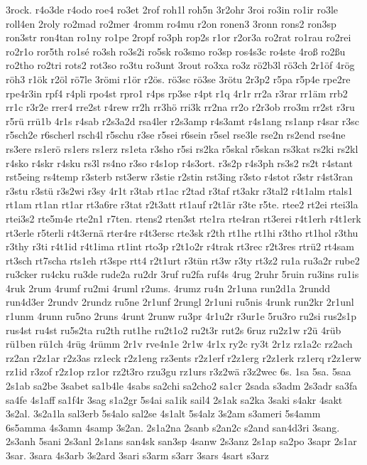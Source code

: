 {3rock.
r4o3de
r4odo
roe4
ro3et
2rof
roh1l
roh5n
3r2ohr
3roi
ro3in
ro1ir
ro3le
roll4en
2roly
ro2mad
ro2mer
4romm
ro4mu
r2on
ronen3
3ronn
rons2
ron3sp
ron3str
ron4tan
ro1ny
ro1pe
2ropf
ro3ph
rop2s
r1or
r2or3a
ro2rat
ro1rau
ro2rei
ro2r1o
ror5th
ro1sé
ro3sh
ro3s2i
ro5sk
ro3smo
ro3sp
ros4s3c
ro4ste
4roß
ro2ßu
ro2tho
ro2tri
rots2
rot3so
ro3tu
ro3unt
3rout
ro3xa
ro3z
rö2b3l
rö3ch
2r1öf
4rög
röh3
r1ök
r2öl
rö7le
3römi
r1ör
r2ös.
rö3sc
rö3se
3rötu
2r3p2
r5pa
r5p4e
rpe2re
rpe4r3in
rpf4
r4pli
rpo4st
rpro1
r4ps
rp3se
r4pt
r1q
4r1r
rr2a
r3rar
rr1äm
rrb2
rr1c
r3r2e
rrer4
rre2st
r4rew
rr2h
rr3hö
rri3k
rr2na
rr2o
r2r3ob
rro3m
rr2st
r3ru
r5rü
rrü1b
4r1s
r4sab
r2s3a2d
rsa4ler
r2s3amp
r4s3amt
r4s1ang
rs1anp
r4sar
r3sc
r5sch2e
r6scherl
rsch4l
r5schu
r3se
r5sei
r6sein
r5sel
rse3le
rse2n
rs2end
rse4ne
rs3ere
rs1erö
rs1ers
rs1erz
rs1eta
r3sho
r5si
rs2ka
r5skal
r5skan
rs3kat
rs2ki
rs2kl
r4sko
r4skr
r4sku
rs3l
rs4no
r3so
r4s1op
r4s3ort.
r3s2p
r4s3ph
rs3s2
rs2t
r4stant
rst5eing
rs4temp
r3sterb
rst3erw
r3stie
r2stin
rst3ing
r3sto
r4stot
r3str
r4st3ran
r3stu
r3stü
r3s2wi
r3sy
4r1t
r3tab
rt1ac
r2tad
r3taf
rt3akr
r3tal2
r4t1alm
rtals1
rt1am
rt1an
rt1ar
rt3a6re
r3tat
r2t3att
rt1auf
r2t1är
r3te
r5te.
rtee2
rt2ei
rtei3la
rtei3s2
rte5m4e
rte2n1
r7ten.
rtens2
rten3st
rte1ra
rte4ran
rt3erei
r4t1erh
r4t1erk
rt3erle
r5terli
r4t3ernä
rter4re
r4t3ersc
rte3sk
r2th
rt1he
rt1hi
r3tho
rt1hol
r3thu
r3thy
r3ti
r4t1id
r4t1ima
rt1int
rto3p
r2t1o2r
r4trak
rt3rec
r2t3res
rtrü2
rt4sam
rt3sch
rt7scha
rts1eh
rt3spe
rtt4
r2t1urt
r3tün
rt3w
r3ty
rt3z2
ru1a
ru3a2r
rube2
ru3cker
ru4cku
ru3de
rude2a
ru2dr
3ruf
ru2fa
ruf4s
4rug
2ruhr
5ruin
ru3ins
ru1is
4ruk
2rum
4rumf
ru2mi
4ruml
r2ums.
4rumz
ru4n
2r1una
run2d1a
2rundd
run4d3er
2rundv
2rundz
ru5ne
2r1unf
2rungl
2r1uni
ru5nis
4runk
run2kr
2r1unl
r1unm
4runn
ru5no
2runs
4runt
2runw
ru3pr
4r1u2r
r3ur1e
5ru3ro
ru2si
rus2s1p
rus4st
ru4st
ru5s2ta
ru2th
rut1he
ru2t1o2
ru2t3r
rut2s
6ruz
ru2z1w
r2ü
4rüb
rü1ben
rü1ch
4rüg
4rümm
2r1v
rve4n1e
2r1w
4r1x
ry2c
ry3t
2r1z
rz1a2c
rz2ach
rz2an
r2z1ar
r2z3as
rz1eck
r2z1eng
rz3ents
r2z1erf
r2z1erg
r2z1erk
rz1erq
r2z1erw
rz1id
r3zof
r2z1op
rz1or
rz2t3ro
rzu3gu
rz1urs
r3z2wä
r3z2wec
6s.
1sa
5sa.
5saa
2s1ab
sa2be
3sabet
sa1b4le
4sabs
sa2chi
sa2cho2
sa1cr
2sada
s3adm
2s3adr
sa3fa
sa4fe
4s1aff
sa1f4r
3sag
s1a2gr
5s4ai
sa1ik
sail4
2s1ak
sa2ka
3saki
s4akr
4sakt
3s2al.
3s2a1la
sal3erb
5s4alo
sal2se
4s1alt
5s4alz
3s2am
s3ameri
5s4amm
6s5amma
4s3amn
4samp
3s2an.
2s1a2na
2sanb
s2an2c
s2and
san4d3ri
3sang.
2s3anh
5sani
2s3anl
2s1ans
san4sk
san3sp
4sanw
2s3anz
2s1ap
sa2po
3sapr
2s1ar
3sar.
3sara
4s3arb
3s2ard
3sari
s3arm
s3arr
3sars
4sart
s3arz
}

